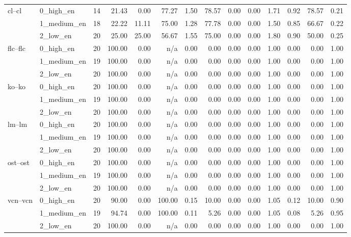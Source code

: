 \begin{tabular}{llrrrrrrrrrrrr}
\cline{1-14}
\multirow[t]{3}{*}{cl--cl} & 0_high_en & 14 & 21.43 & 0.00 & 77.27 & 1.50 & 78.57 & 0.00 & 0.00 & 1.71 & 0.92 & 78.57 & 0.21 \\
 & 1_medium_en & 18 & 22.22 & 11.11 & 75.00 & 1.28 & 77.78 & 0.00 & 0.00 & 1.50 & 0.85 & 66.67 & 0.22 \\
 & 2_low_en & 20 & 25.00 & 25.00 & 56.67 & 1.55 & 75.00 & 0.00 & 0.00 & 1.80 & 0.90 & 50.00 & 0.25 \\
\cline{1-14}
\multirow[t]{3}{*}{flc--flc} & 0_high_en & 20 & 100.00 & 0.00 & n/a & 0.00 & 0.00 & 0.00 & 0.00 & 1.00 & 0.00 & 0.00 & 1.00 \\
 & 1_medium_en & 19 & 100.00 & 0.00 & n/a & 0.00 & 0.00 & 0.00 & 0.00 & 1.00 & 0.00 & 0.00 & 1.00 \\
 & 2_low_en & 20 & 100.00 & 0.00 & n/a & 0.00 & 0.00 & 0.00 & 0.00 & 1.00 & 0.00 & 0.00 & 1.00 \\
\cline{1-14}
\multirow[t]{3}{*}{ko--ko} & 0_high_en & 20 & 100.00 & 0.00 & n/a & 0.00 & 0.00 & 0.00 & 0.00 & 1.00 & 0.00 & 0.00 & 1.00 \\
 & 1_medium_en & 19 & 100.00 & 0.00 & n/a & 0.00 & 0.00 & 0.00 & 0.00 & 1.00 & 0.00 & 0.00 & 1.00 \\
 & 2_low_en & 20 & 100.00 & 0.00 & n/a & 0.00 & 0.00 & 0.00 & 0.00 & 1.00 & 0.00 & 0.00 & 1.00 \\
\cline{1-14}
\multirow[t]{3}{*}{lm--lm} & 0_high_en & 20 & 100.00 & 0.00 & n/a & 0.00 & 0.00 & 0.00 & 0.00 & 1.00 & 0.00 & 0.00 & 1.00 \\
 & 1_medium_en & 19 & 100.00 & 0.00 & n/a & 0.00 & 0.00 & 0.00 & 0.00 & 1.00 & 0.00 & 0.00 & 1.00 \\
 & 2_low_en & 20 & 100.00 & 0.00 & n/a & 0.00 & 0.00 & 0.00 & 0.00 & 1.00 & 0.00 & 0.00 & 1.00 \\
\cline{1-14}
\multirow[t]{3}{*}{ost--ost} & 0_high_en & 20 & 100.00 & 0.00 & n/a & 0.00 & 0.00 & 0.00 & 0.00 & 1.00 & 0.00 & 0.00 & 1.00 \\
 & 1_medium_en & 19 & 100.00 & 0.00 & n/a & 0.00 & 0.00 & 0.00 & 0.00 & 1.00 & 0.00 & 0.00 & 1.00 \\
 & 2_low_en & 20 & 100.00 & 0.00 & n/a & 0.00 & 0.00 & 0.00 & 0.00 & 1.00 & 0.00 & 0.00 & 1.00 \\
\cline{1-14}
\multirow[t]{3}{*}{vcn--vcn} & 0_high_en & 20 & 90.00 & 0.00 & 100.00 & 0.15 & 10.00 & 0.00 & 0.00 & 1.05 & 0.12 & 10.00 & 0.90 \\
 & 1_medium_en & 19 & 94.74 & 0.00 & 100.00 & 0.11 & 5.26 & 0.00 & 0.00 & 1.05 & 0.08 & 5.26 & 0.95 \\
 & 2_low_en & 20 & 100.00 & 0.00 & n/a & 0.00 & 0.00 & 0.00 & 0.00 & 1.00 & 0.00 & 0.00 & 1.00 \\
\cline{1-14}
\bottomrule
\end{tabular}
